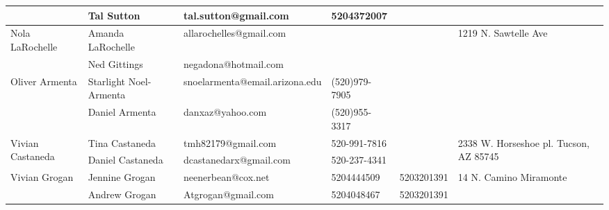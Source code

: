 \documentclass[landscape]{article}\usepackage[]{graphicx}\usepackage[]{color}
\begin{document}
\begin{longtable}{|p{100pt}|p{100pt}|p{140pt}|p{60pt}|p{64pt}|p{120pt}|}
 & Tal Sutton & tal.sutton@gmail.com & 5204372007 &  & \\
\hline
\multirow{2}{100pt}{Nola LaRochelle} & Amanda LaRochelle & allarochelles@gmail.com &  &  & \multirow{2}{120pt}{1219 N. Sawtelle Ave} \\
 & Ned Gittings & negadona@hotmail.com &  &  & \\
\hline
\multirow{2}{100pt}{Oliver Armenta} & Starlight Noel-Armenta & snoelarmenta@email.arizona.edu & (520)979-7905 &  & \multirow{2}{120pt}{} \\
 & Daniel Armenta  & danxaz@yahoo.com & (520)955-3317 &  & \\
\hline
\multirow{2}{100pt}{Vivian Castaneda} & Tina Castaneda & tmh82179@gmail.com & 520-991-7816 &  & \multirow{2}{120pt}{2338 W. Horseshoe pl. Tucson, AZ 85745} \\
 & Daniel Castaneda & dcastanedarx@gmail.com & 520-237-4341 &  & \\
\hline
\multirow{2}{100pt}{Vivian Grogan } & Jennine Grogan & neenerbean@cox.net & 5204444509 & 5203201391 & \multirow{2}{120pt}{14 N. Camino Miramonte} \\
 & Andrew Grogan  & Atgrogan@gmail.com  & 5204048467 & 5203201391 & \\
\hline
\end{longtable}
\newpage
\end{document}
